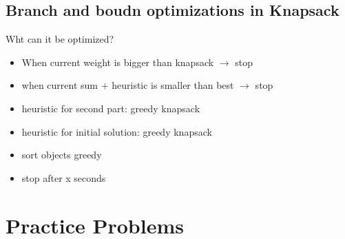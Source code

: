 \documentclass[10pt]{beamer}
\begin{document}
\subsection{Branch and boudn optimizations in Knapsack}
\begin{frame}
	
	\begin{block}{Wht can it be optimized?}
		\begin{itemize}
			\pause
			\item When current weight is bigger than knapsack $\rightarrow$ stop 
			\pause
			\item when current sum + heuristic is smaller than best $\rightarrow$ stop
			\pause
			\item heuristic for second part: greedy knapsack
			\pause
			\item heuristic for initial solution: greedy knapsack
			\pause
			\item sort objects greedy
			\pause
			\item stop after x seconds
		\end{itemize}
		
		
	\end{block}
\end{frame}












\section{Practice Problems}
\end{document}
